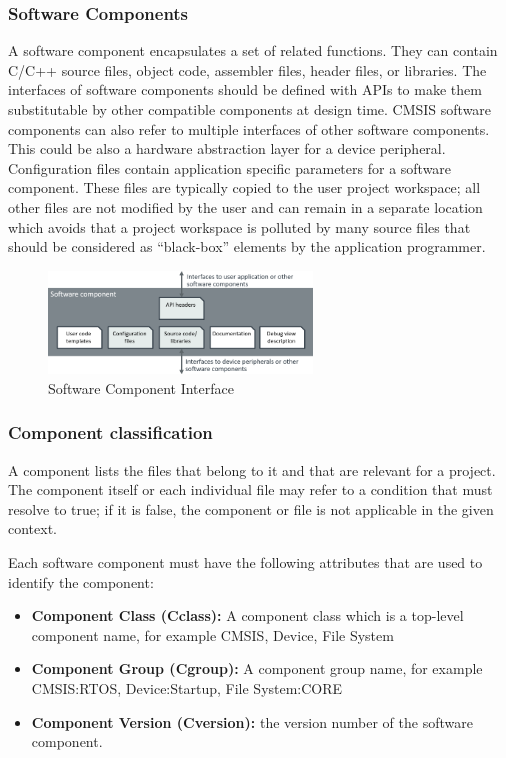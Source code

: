 \subsubsection{Software Components}
A software component encapsulates a set of related functions. They can contain C/C++ source files, object code, assembler files, header files, or libraries. The interfaces of software components should be defined with APIs to make them substitutable by other compatible components at design time.
CMSIS software components can also refer to multiple interfaces of other software components. This could be also a hardware abstraction layer for a device peripheral.
Configuration files contain application specific parameters for a software component. These files are typically copied to the user project workspace; all other files are not modified by the user and can remain in a separate location which avoids that a project workspace is polluted by many source files that should be considered as “black-box” elements by the application programmer.
\begin{figure}[H]
  \centering
  \includegraphics[width=7cm]{img/ST_Summer_Internship/software_component.png}
  \caption{Software Component Interface}
  \label{fig:sw_comp}
\end{figure}
\subsubsection{Component classification}
A component lists the files that belong to it and that are relevant for a project. The component itself or each individual file may refer to a condition that must resolve to true; if it is false, the component or file is not applicable in the given context.

Each software component must have the following attributes that are used to identify the component:
\begin{itemize}
    \item \textbf{Component Class (Cclass):} A component class which is a top-level component name, for example CMSIS, Device, File System
    \item \textbf{Component Group (Cgroup):} A component group name, for example CMSIS:RTOS, Device:Startup, File System:CORE
    \item \textbf{Component Version (Cversion):} the version number of the software component.
\end{itemize}



